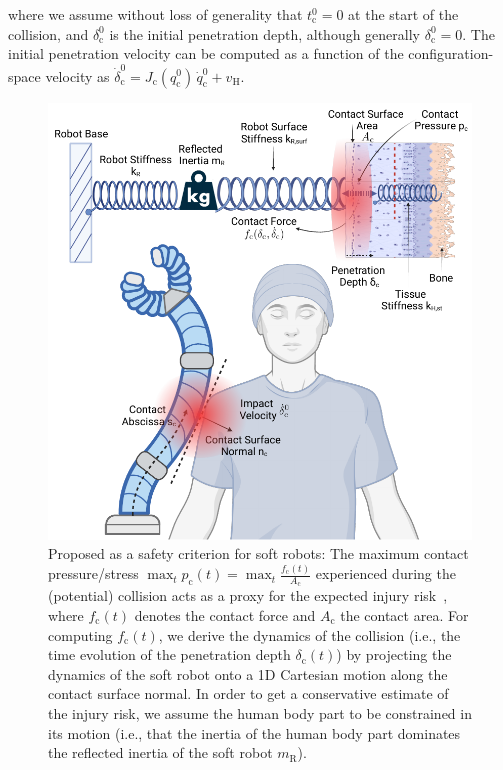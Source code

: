 where we assume without loss of generality that $t_\mathrm{c}^0=0$ at the start of the collision, and $\delta_\mathrm{c}^0$ is the initial penetration depth, although generally $\delta_\mathrm{c}^0 = 0$.
The initial penetration velocity can be computed as a function of the configuration-space velocity as $\dot{\delta}_\mathrm{c}^0 = J_\mathrm{c}(q_{\mathrm{c}}^0) \, \dot{q}_{\mathrm{c}}^0 + v_\mathrm{H}$.

\begin{figure}[h!]
    \centering
    \includegraphics[width=0.65\linewidth]{safetymetric/figures/injury_severity_criterion.pdf}
    \caption{Proposed  as a safety criterion for soft robots: The maximum contact pressure/stress $\max_t p_\mathrm{c}(t) = \max_t \frac{f_\mathrm{c}(t)}{A_\mathrm{c}}$ experienced during the (potential) collision acts as a proxy for the expected injury risk~\citep{iso2016collaborative}, where $f_\mathrm{c}(t)$ denotes the contact force and $A_\mathrm{c}$ the contact area. For computing $f_\mathrm{c}(t)$, we derive the dynamics of the collision (i.e., the time evolution of the penetration depth $\delta_\mathrm{c}(t)$) by projecting the dynamics of the soft robot onto a 1D Cartesian motion along the contact surface normal. In order to get a conservative estimate of the injury risk, we assume the human body part to be constrained in its motion (i.e., that the inertia of the human body part dominates the reflected inertia of the soft robot $m_\mathrm{R}$).}
    \label{fig:safetymetric:injury_severity_criterion_illustration}
\end{figure}

